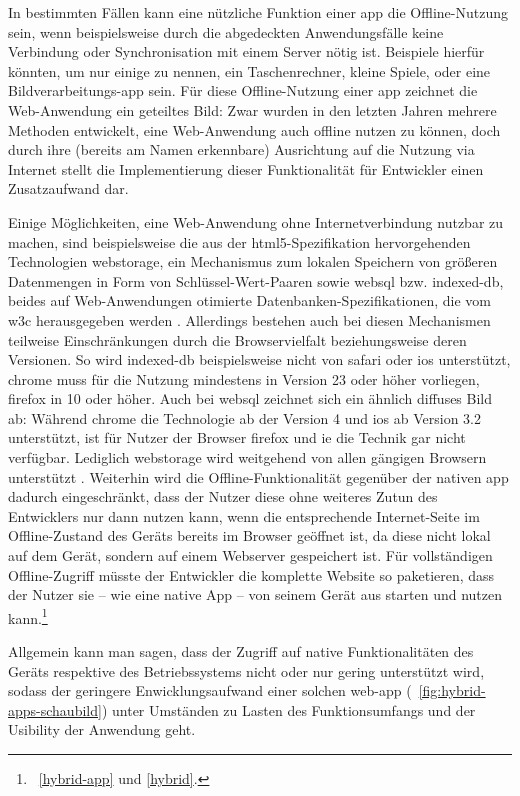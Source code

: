 In bestimmten Fällen kann eine nützliche Funktion einer \gls{app} die Offline-Nutzung sein, wenn beispielsweise durch die abgedeckten Anwendungsfälle keine Verbindung oder Synchronisation mit einem Server nötig ist. Beispiele hierfür könnten, um nur einige zu nennen, ein Taschenrechner, kleine Spiele, oder eine Bildverarbeitungs-\gls{app} sein. 
Für diese Offline-Nutzung einer \gls{app} zeichnet die Web-Anwendung ein geteiltes Bild: Zwar wurden in den letzten Jahren mehrere Methoden entwickelt, eine Web-Anwendung auch offline nutzen zu können, doch durch ihre (bereits am Namen erkennbare) Ausrichtung auf die Nutzung via Internet stellt die Implementierung dieser Funktionalität für Entwickler einen Zusatzaufwand dar. 

Einige Möglichkeiten, eine Web-Anwendung ohne Internetverbindung nutzbar zu machen, sind beispielsweise die aus der \gls{html5}-Spezifikation hervorgehenden Technologien \gls{webstorage}, ein Mechanismus zum lokalen Speichern von größeren Datenmengen in Form von Schlüssel-Wert-Paaren \cite{w3c_webstorage} sowie \gls{websql} bzw. \gls{indexed-db}, beides auf Web-Anwendungen otimierte Datenbanken-Spezifikationen, die vom \gls{w3c} herausgegeben werden \cite{w3c_websql, w3c_indexedDB}.
Allerdings bestehen auch bei diesen Mechanismen teilweise Einschränkungen durch die Browservielfalt beziehungsweise deren Versionen. So wird \gls{indexed-db} beispielsweise nicht von \gls{safari} oder \gls{ios} unterstützt, \gls{chrome} muss für die Nutzung mindestens in Version 23 oder höher vorliegen, \gls{firefox} in 10 oder höher. 
Auch bei \gls{websql} zeichnet sich ein ähnlich diffuses Bild ab: Während \gls{chrome} die Technologie ab der Version 4 und \gls{ios} ab Version 3.2 unterstützt, ist für Nutzer der Browser \gls{firefox} und \gls{ie} die Technik gar nicht verfügbar.
Lediglich \gls{webstorage} wird weitgehend von allen gängigen Browsern unterstützt \cite{html5-rocks_offline}.
Weiterhin wird die Offline-Funktionalität gegenüber der nativen \gls{app} dadurch eingeschränkt, dass der Nutzer diese ohne weiteres Zutun des Entwicklers nur dann nutzen kann, wenn die entsprechende Internet-Seite im Offline-Zustand des Geräts bereits im Browser geöffnet ist, da diese nicht lokal auf dem Gerät, sondern auf einem Webserver gespeichert ist.
Für vollständigen Offline-Zugriff müsste der Entwickler die komplette Website so paketieren, dass der Nutzer sie -- wie eine native App -- von seinem Gerät aus starten und nutzen kann.\footnote{\seename\ \autoref{hybrid-app} und \ref{hybrid}.}

Allgemein kann man sagen, dass der Zugriff auf native Funktionalitäten des Geräts respektive des Betriebssystems nicht oder nur gering unterstützt wird, sodass der geringere Enwicklungsaufwand einer solchen \gls{web-app} (\seename\  \autoref{fig:hybrid-apps-schaubild}) unter Umständen zu Lasten des Funktionsumfangs und der Usibility der Anwendung geht.

